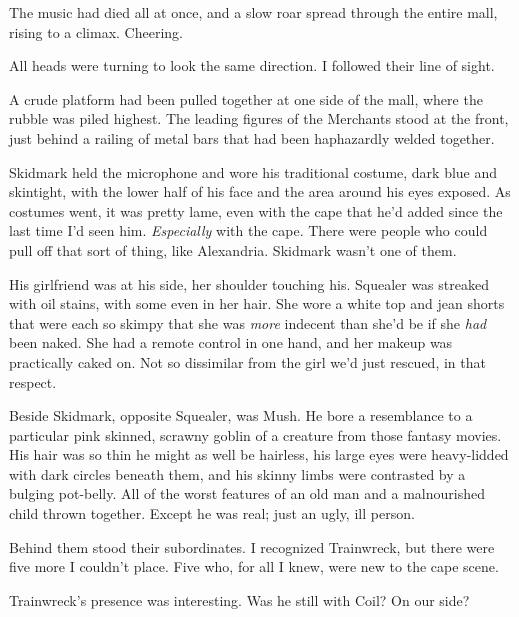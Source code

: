 The music had died all at once, and a slow roar spread through the entire mall, rising to a climax.  Cheering.



All heads were turning to look the same direction.  I followed their line of sight.



A crude platform had been pulled together at one side of the mall, where the rubble was piled highest.  The leading figures of the Merchants stood at the front, just behind a railing of metal bars that had been haphazardly welded together.



Skidmark held the microphone and wore his traditional costume, dark blue and skintight, with the lower half of his face and the area around his eyes exposed.  As costumes went, it was pretty lame, even with the cape that he'd added since the last time I'd seen him.  \emph{Especially }with the cape.  There were people who could pull off that sort of thing, like Alexandria.  Skidmark wasn't one of them.



His girlfriend was at his side, her shoulder touching his.  Squealer was streaked with oil stains, with some even in her hair.  She wore a white top and jean shorts that were each so skimpy that she was \emph{more} indecent than she'd be if she \emph{had} been naked.  She had a remote control in one hand, and her makeup was practically caked on.  Not so dissimilar from the girl we'd just rescued, in that respect.



Beside Skidmark, opposite Squealer, was Mush.  He bore a resemblance to a particular pink skinned, scrawny goblin of a creature from those fantasy movies.  His hair was so thin he might as well be hairless, his large eyes were heavy-lidded with dark circles beneath them, and his skinny limbs were contrasted by a bulging pot-belly.  All of the worst features of an old man and a malnourished child thrown together.  Except he was real; just an ugly, ill person.



Behind them stood their subordinates.  I recognized Trainwreck, but there were five more I couldn't place.  Five who, for all I knew, were new to the cape scene.



Trainwreck's presence was interesting.  Was he still with Coil?  On our side?



